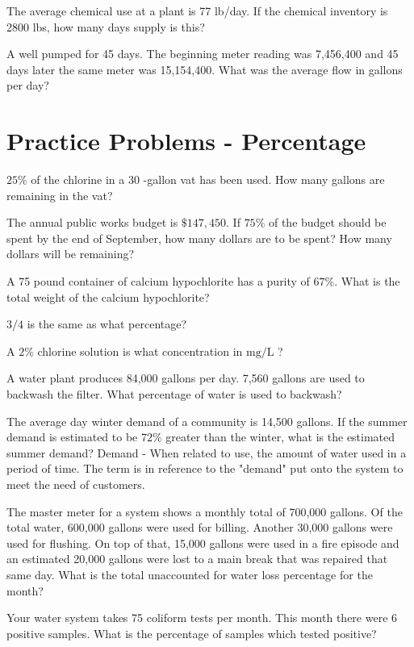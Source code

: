 The average chemical use at a plant is 77 lb/day. If the chemical inventory is 2800 lbs, how many days supply is this?

A well pumped for 45 days. The beginning meter reading was 7,456,400 and 45 days later the same meter was 15,154,400. What was the average flow in gallons per day?

\vspace{1cm}

\section*{Practice Problems - Percentage}

$25 \%$ of the chlorine in a 30 -gallon vat has been used. How many gallons are remaining in the vat?

The annual public works budget is $\$ 147,450$. If $75 \%$ of the budget should be spent by the end of September, how many dollars are to be spent? How many dollars will be remaining?

A 75 pound container of calcium hypochlorite has a purity of $67 \%$. What is the total weight of the calcium hypochlorite? 

$3 / 4$ is the same as what percentage?

A $2 \%$ chlorine solution is what concentration in $\mathrm{mg} / \mathrm{L}$ ?

A water plant produces 84,000 gallons per day. 7,560 gallons are used to backwash the filter. What percentage of water is used to backwash?

The average day winter demand of a community is 14,500 gallons. If the summer demand is estimated to be $72 \%$ greater than the winter, what is the estimated summer demand? Demand - When related to use, the amount of water used in a period of time. The term is in reference to the "demand" put onto the system to meet the need of customers.

The master meter for a system shows a monthly total of 700,000 gallons. Of the total water, 600,000 gallons were used for billing. Another 30,000 gallons were used for flushing. On top of that, 15,000 gallons were used in a fire episode and an estimated 20,000 gallons were lost to a main break that was repaired that same day. What is the total unaccounted for water loss percentage for the month?

Your water system takes 75 coliform tests per month. This month there were 6 positive samples. What is the percentage of samples which tested positive?


